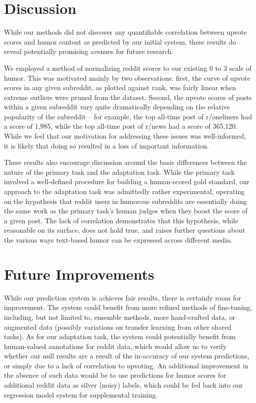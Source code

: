 \documentclass{article}
\begin{document}
\section{Discussion}

While our methods did not discover any quantifiable correlation between upvote scores and humor content as predicted by our initial system, these results do reveal potentially promising avenues for future research.

We employed a method of normalizing reddit scores to our existing 0 to 3 scale of humor. This was motivated mainly by two observations: first, the curve of upvote scores in any given subreddit, as plotted against rank, was fairly linear when extreme outliers were pruned from the dataset. Second, the upvote scores of posts within a given subreddit vary quite dramatically depending on the relative popularity of the subreddit -- for example, the top all-time post of r/oneliners had a score of 1,985, while the top all-time post of r/news had a score of 365,120. While we feel that our motivation for addressing these issues was well-informed, it is likely that doing so resulted in a loss of important information.

These results also encourage discussion around the basic differences between the nature of the primary task and the adaptation task. While the primary task involved a well-defined procedure for building a human-scored gold standard, our approach to the adaptation task was admittedly rather experimental, operating on the hypothesis that reddit users in humorous subreddits are essentially doing the same work as the primary task's human judges when they boost the score of a given post. The lack of correlation demonstrates that this hypothesis, while reasonable on its surface, does not hold true, and raises further questions about the various ways text-based humor can be expressed across different media.

\section{Future Improvements}
While our prediction system is achieves fair results, there is certainly room for improvement.
The system could benefit from more refined methods of fine-tuning, including, but not limited to, ensemble methods, more hand-crafted data, or augmented data (possibly variations on transfer learning from other shared tasks).
As for our adaptation task, the system could potentially benefit from human-valued annotations for reddit data, which would allow us to verify whether our null results are a result of the in-accuracy of our system predictions, or simply due to a lack of correlation to upvoting. An additional improvement in the absence of such data would be to use predictions for humor scores for additional reddit data as silver (noisy) labels, which could be fed back into our regression model system for supplemental training.
\end{document}
